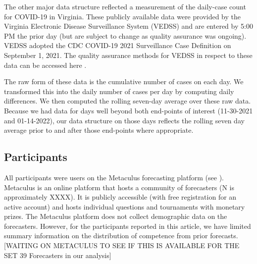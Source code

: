 \documentclass[a4paper,man,natbib]{apa6}
\begin{document}
The other major data structure reflected a measurement of the daily-case count for COVID-19 in Virginia.  These publicly available data were provided by the Virginia Electronic Disease Surveillance System (VEDSS) \citep{VDHOnline} and are entered by 5:00 PM the prior day (but are subject to change as quality assurance was ongoing).  VEDSS adopted the CDC COVID-19 2021 Surveillance Case Definition \citep{CDCguide} on September 1, 2021.  The quality assurance methods for VEDSS in respect to these data can be accessed here \citep{VDHquality}.

The raw form of these data is the cumulative number of cases on each day.  We transformed this into the daily number of cases per day by computing daily differences.  We then computed the rolling seven-day average over these raw data.  Because we had data for days well beyond both end-points of interest (11-30-2021 and 01-14-2022), our data structure on those days reflects the rolling seven day average prior to and after those end-points where appropriate.

\subsection{Participants}\label{participants}
All participants were users on the Metaculus forecasting platform (see \citep{metaculus}).  Metaculus is an online platform that hosts a community of forecasters (N is approximately XXXX). It is publicly accessible (with free registration for an active account) and hosts individual questions and tournaments with monetary prizes.  The Metaculus platform does not collect demographic data on the forecasters.  However, for the participants reported in this article, we have limited summary information on the distribution of competence from prior forecasts. [WAITING ON METACULUS TO SEE IF THIS IS AVAILABLE FOR THE SET 39 Forecasters in our analysis]
\end{document}
